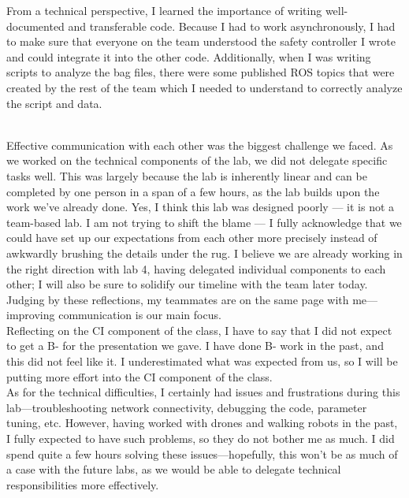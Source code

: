 \documentclass{article}
\begin{document}
From a technical perspective, I learned the importance of writing well-documented and transferable code. Because I had to work asynchronously, I had to make sure that everyone on the team understood the safety controller I wrote and could integrate it into the other code. Additionally, when I was writing scripts to analyze the bag files, there were some published ROS topics that were created by the rest of the team which I needed to understand to correctly analyze the script and data.\\


\author{\textbf{Savva Morozov}} \\

Effective communication with each other was the biggest challenge we faced.
As we worked on the technical components of the lab, we did not delegate specific tasks well.
This was largely because the lab is inherently linear and can be completed by one person in a span of a few hours, as the lab builds upon the work we've already done.
Yes, I think this lab was designed poorly — it is not a team-based lab.
I am not trying to shift the blame — I fully acknowledge that we could have set up our expectations from each other more precisely instead of awkwardly brushing the details under the rug.
I believe we are already working in the right direction with lab 4, having delegated individual components to each other; I will also be sure to solidify our timeline with the team later today.
Judging by these reflections, my teammates are on the same page with me---improving communication is our main focus. \\

Reflecting on the CI component of the class, I have to say that I did not expect to get a B- for the presentation we gave. 
I have done B- work in the past, and this did not feel like it. 
I underestimated what was expected from us, so I will be putting more effort into the CI component of the class. \\

As for the technical difficulties, I certainly had issues and frustrations during this lab---troubleshooting network connectivity, debugging the code, parameter tuning, etc. 
However, having worked with drones and walking robots in the past, I fully expected to have such problems, so they do not bother me as much.
I did spend quite a few hours solving these issues---hopefully, this won't be as much of a case with the future labs, as we would be able to delegate technical responsibilities more effectively.
\end{document}
